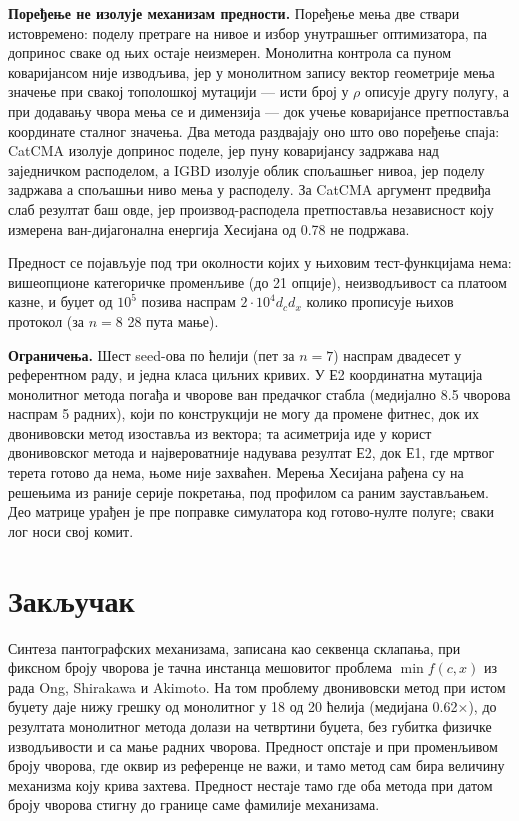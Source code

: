 \documentclass[
  conference,
  a4paper,
  10pt]{IEEEtran}
\begin{document}
\textbf{Поређење не изолује механизам предности.} Поређење мења две
ствари истовремено: поделу претраге на нивое и избор унутрашњег
оптимизатора, па допринос сваке од њих остаје неизмерен. Монолитна
контрола са пуном коваријансом није изводљива, јер у монолитном запису
вектор геометрије мења значење при свакој тополошкој мутацији --- исти
број у \(\rho\) описује другу полугу, а при додавању чвора мења се и
димензија --- док учење коваријансе претпоставља координате сталног
значења. Два метода раздвајају оно што ово поређење спаја: CatCMA
изолује допринос поделе, јер пуну коваријансу задржава над заједничком
расподелом, а IGBD изолује облик спољашњег нивоа, јер поделу задржава а
спољашњи ниво мења у расподелу. За CatCMA аргумент предвиђа слаб
резултат баш овде, јер производ-расподела претпоставља независност коју
измерена ван-дијагонална енергија Хесијана од 0.78 не подржава.

Предност се појављује под три околности којих у њиховим тест-функцијама
нема: вишеопционе категоричке променљиве (до 21 опције), неизводљивост
са платоом казне, и буџет од \(10^5\) позива наспрам
\(2\cdot10^4 d_c d_x\) колико прописује њихов протокол (за \(n=8\) 28
пута мање).

\textbf{Ограничења.} Шест seed-ова по ћелији (пет за \(n=7\)) наспрам
двадесет у референтном раду, и једна класа циљних кривих. У Е2
координатна мутација монолитног метода погађа и чворове ван предачког
стабла (медијално 8.5 чворова наспрам 5 радних), који по конструкцији не
могу да промене фитнес, док их двонивовски метод изоставља из вектора;
та асиметрија иде у корист двонивовског метода и највероватније надувава
резултат Е2, док Е1, где мртвог терета готово да нема, њоме није
захваћен. Мерења Хесијана рађена су на решењима из раније серије
покретања, под профилом са раним заустављањем. Део матрице урађен је пре
поправке симулатора код готово-нулте полуге; сваки лог носи свој комит.

\hypertarget{ux437ux430ux43aux459ux443ux447ux430ux43a}{%
\section{Закључак}\label{ux437ux430ux43aux459ux443ux447ux430ux43a}}

Синтеза пантографских механизама, записана као секвенца склапања, при
фиксном броју чворова је тачна инстанца мешовитог проблема
\(\min f(c,x)\) из рада Ong, Shirakawa и Akimoto. На том проблему
двонивовски метод при истом буџету даје нижу грешку од монолитног у 18
од 20 ћелија (медијана 0.62×), до резултата монолитног метода долази на
четвртини буџета, без губитка физичке изводљивости и са мање радних
чворова. Предност опстаје и при променљивом броју чворова, где оквир из
референце не важи, и тамо метод сам бира величину механизма коју крива
захтева. Предност нестаје тамо где оба метода при датом броју чворова
стигну до границе саме фамилије механизама.
\end{document}
